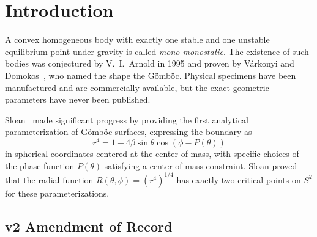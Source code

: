 \documentclass[11pt,a4paper]{article}
\begin{document}
\begin{abstract}
This v2 retains Phase-1 as a verified mono-monostatic body in the
Sloan-extension family, demonstrates that the verified
mono-monostatic set in the Fourier-phase family is an open regime
extending into $k=2$ and $k=3$ sub-families beyond Phase-1's $k=1$
slice, retains the Sloan negative finding at admissible $\beta$
above $\approx 0.036$ (attributed to strict-convexity loss), and contributes a
verification methodology (strict-convexity gate by analytical
Gaussian curvature; identity-based ECS classification via analytical
$R$-critical-point counting) that is more rigorous than the
mesh-vertex basin counter of v1.

\medskip\noindent
\textbf{Keywords:} mono-monostatic body, G\"omb\"oc, equilibrium
stability, V\'arkonyi-Domokos identity, Gauss map, strict convexity,
Gaussian curvature, support function, Sloan parameterization
\end{abstract}

\section{Introduction}

A convex homogeneous body with exactly one stable and one unstable
equilibrium point under gravity is called \emph{mono-monostatic}.
The existence of such bodies was conjectured by V.~I.~Arnold in
1995 and proven by V\'arkonyi and
Domokos~\cite{varkonyi2006,varkonyi2006b}, who named the shape the
G\"omb\"oc. Physical specimens have been manufactured and are
commercially available, but the exact geometric parameters have
never been published.

Sloan~\cite{sloan2023} made significant progress by providing the
first analytical parameterization of G\"omb\"oc surfaces, expressing
the boundary as
\begin{equation}
r^4 = 1 + 4\beta\sin\theta\cos(\phi - P(\theta))
\label{eq:sloan}
\end{equation}
in spherical coordinates centered at the center of mass, with
specific choices of the phase function $P(\theta)$ satisfying a
center-of-mass constraint. Sloan proved that the radial function
$R(\theta,\phi) = (r^4)^{1/4}$ has exactly two critical points on
$S^2$ for these parameterizations.

\subsection{v2 Amendment of Record}
\label{sec:v2_amendment}
\end{document}

